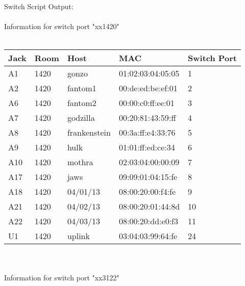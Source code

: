 \documentclass{article}
\begin{document}
  
Switch Script Output:
\\
\\
Information for switch port "xx1420"
\\
\\
\begin{tabular}{| l | l | l | l | l |}
\hline
Jack & Room & Host & MAC & Switch Port \\
\hline
A1 & 1420 & gonzo & 01:02:03:04:05:05 & 1 \\
\hline
A2 & 1420 & fantom1 & 00:de:ed:be:ef:01 & 2 \\
\hline
A6 & 1420 & fantom2 & 00:00:c0:ff:ee:01 & 3 \\
\hline
A7 & 1420 & godzilla & 00:20:81:43:59:ff & 4 \\
\hline
A8 & 1420 & frankenstein & 00:3a:ff:e4:33:76 & 5 \\
\hline
A9 & 1420 & hulk & 01:01:ff:ed:ce:34 & 6 \\
\hline
A10 & 1420 & mothra & 02:03:04:00:00:09 & 7 \\
\hline
A17 & 1420 & jaws & 09:09:01:04:15:fe & 8 \\
\hline
A18 & 1420 & 04/01/13 & 08:00:20:00:f4:fe & 9 \\
\hline
A21 & 1420 & 04/02/13 & 08:00:20:01:44:8d & 10 \\
\hline
A22 & 1420 & 04/03/13 & 08:00:20:dd:e0:f3 & 11 \\
\hline
U1 & 1420 & uplink & 03:04:03:99:64:fe & 24 \\
\hline
\end{tabular}
\\
\\
Information for switch port "xx3122"
\\
\\
\end{document}
